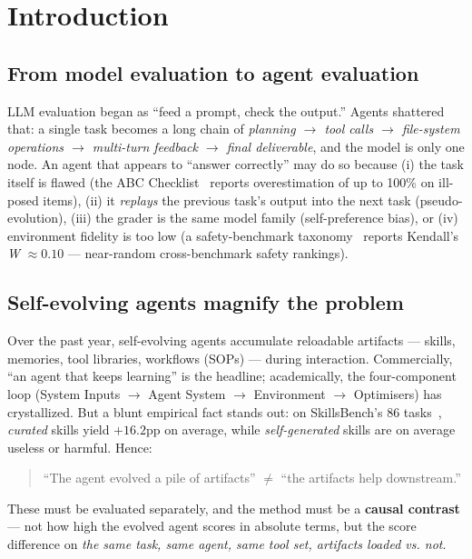 \documentclass{article}
\begin{document}
\section{Introduction}

\subsection{From model evaluation to agent evaluation}

LLM evaluation began as ``feed a prompt, check the output.'' Agents shattered that: a single task becomes a long chain of \emph{planning $\rightarrow$ tool calls $\rightarrow$ file-system operations $\rightarrow$ multi-turn feedback $\rightarrow$ final deliverable}, and the model is only one node. An agent that appears to ``answer correctly'' may do so because (i) the task itself is flawed (the ABC Checklist~\citep{zhu2025abc} reports overestimation of up to 100\% on ill-posed items), (ii) it \emph{replays} the previous task's output into the next task (pseudo-evolution), (iii) the grader is the same model family (self-preference bias), or (iv) environment fidelity is too low (a safety-benchmark taxonomy~\citep{fu2025raseval} reports Kendall's \emph{W} $\approx 0.10$ --- near-random cross-benchmark safety rankings).

\subsection{Self-evolving agents magnify the problem}

Over the past year, self-evolving agents accumulate reloadable artifacts --- skills, memories, tool libraries, workflows (SOPs) --- during interaction. Commercially, ``an agent that keeps learning'' is the headline; academically, the four-component loop (System Inputs $\rightarrow$ Agent System $\rightarrow$ Environment $\rightarrow$ Optimisers) has crystallized. But a blunt empirical fact stands out: on SkillsBench's 86 tasks~\citep{li2026skillsbench}, \emph{curated} skills yield $+16.2$pp on average, while \emph{self-generated} skills are on average useless or harmful. Hence:

\begin{quote}
``The agent evolved a pile of artifacts'' $\neq$ ``the artifacts help downstream.''
\end{quote}

These must be evaluated separately, and the method must be a \textbf{causal contrast} --- not how high the evolved agent scores in absolute terms, but the score difference on \emph{the same task, same agent, same tool set, artifacts loaded vs. not}.
\end{document}
